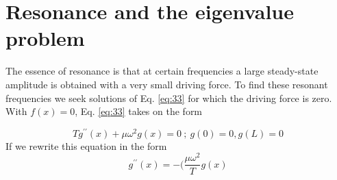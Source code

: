 \documentclass{book}
\theoremstyle{plain}
\theoremstyle{definition}
\numberwithin{exm}{chapter}
\theoremstyle{remark}
\theoremstyle{summary}
\theoremstyle{overview}
\begin{document}
\section*{Resonance and the eigenvalue problem}
The essence of resonance is that at certain frequencies a large steady-state amplitude is obtained with a very small driving force. To find these resonant frequencies
we seek solutions of Eq. \eqref{eq:33} for which the driving force is zero. With $f(x) = 0$,
Eq. \eqref{eq:33} takes on the form

\begin{equation}\label{eq:35}
		Tg^{\prime\prime}(x) + \mu \omega ^ 2 g(x) = 0 \ ; \ g(0) = 0, g(L) = 0
				\end{equation}
				If we rewrite this equation in the form
				\begin{equation}\label{eq:36}
		g^{\prime\prime}(x) = - (\frac{\mu \omega^2}{T}g(x)
				\end{equation}
				
\end{document}
